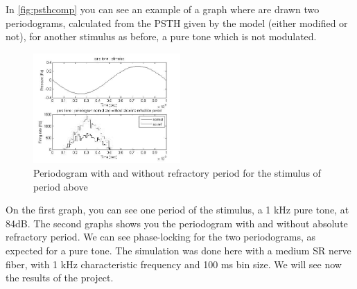 In \autoref{fig:psthcomp} you can see an example of a graph
where are drawn two periodograms, calculated from the PSTH given by the model 
(either modified or not), for another stimulus as before, a pure tone
which is not modulated.


\begin{figure}[h]
	\centering
	\includegraphics[width=0.5\textwidth]{images/stim-psth-puretone-bw2.jpg}
	\caption{Periodogram with and without refractory period for the stimulus of period above}
	\label{fig:psthcomp}
\end{figure} 

On the first graph, you can see one period of the stimulus, a 1 kHz pure tone, at 84dB.
The second graphs shows you the periodogram with and without absolute refractory period.
We can see phase-locking for the two periodograms, as expected for a pure tone.
The simulation was done here with a medium SR nerve fiber, 
with 1 kHz characteristic frequency and 100 ms bin size.
We will see now the results of the project.



 





